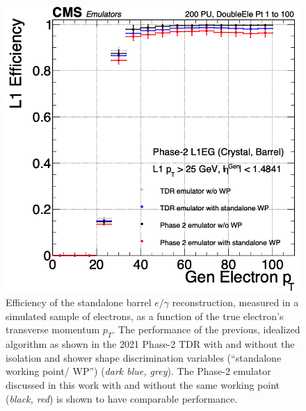 \begin{figure}[ht]
    \centering
    \includegraphics[width=12cm]{figures/ch-4-phase2/results-egamma-efficiency-gt25.png}
    \caption[Efficiency of the standalone barrel $e/\gamma$ reconstruction, as a function of the true electron's transverse momentum $p_{T}$.]{Efficiency of the standalone barrel $e/\gamma$ reconstruction, measured in a simulated sample of electrons, as a function of the true electron's transverse momentum $p_{T}$. The performance of the previous, idealized algorithm as shown in the 2021 Phase-2 TDR \cite{CMS-TDR-021} with and without the isolation and shower shape discrimination variables (``standalone working point/ WP'') (\textit{dark blue, grey}). The Phase-2 emulator discussed in this work with and without the same working point (\textit{black, red}) is shown to have comparable performance.}
    \label{fig:results-egamma-efficiency-gt25}
\end{figure}

